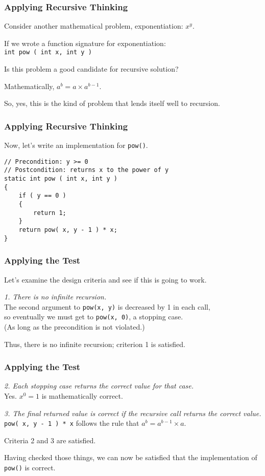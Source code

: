 \begin{frame}
\frametitle{Applying Recursive Thinking}
Consider another mathematical problem, exponentiation: $x^{y}$.

If we wrote a function signature for exponentiation:\\ \texttt{int pow ( int x, int y )}

Is this problem a good candidate for recursive solution?

Mathematically, $a^{b} = a \times a^{b-1}$.

So, yes, this is the kind of problem that lends itself well to recursion.


\end{frame}

\begin{frame}[fragile]
\frametitle{Applying Recursive Thinking}
Now, let's write an implementation for \texttt{pow()}.

\begin{verbatim}
// Precondition: y >= 0
// Postcondition: returns x to the power of y
static int pow ( int x, int y )
{
    if ( y == 0 )
    {
        return 1;
    }
    return pow( x, y - 1 ) * x;
}
\end{verbatim}

\end{frame}

\begin{frame}
\frametitle{Applying the Test}
Let's examine the design criteria and see if this is going to work.

\textit{1. There is no infinite recursion.}\\
\quad The second argument to \texttt{pow(x, y)} is decreased by 1 in each call,\\ \quad so eventually we must get to \texttt{pow(x, 0)}, a stopping case.\\
\quad \quad (As long as the precondition is not violated.)

Thus, there is no infinite recursion; criterion 1 is satisfied.

\end{frame}

\begin{frame}
\frametitle{Applying the Test}

\textit{2. Each stopping case returns the correct value for that case.}\\
\quad Yes. $x^{0} = 1$ is mathematically correct.

\textit{3. The final returned value is correct if the recursive call returns the correct value.}\\
\quad \texttt{pow( x, y - 1 ) * x} follows the rule that $a^{b} = a^{b-1} \times a$.

Criteria 2 and 3 are satisfied.

Having checked those things, we can now be satisfied that the implementation of \texttt{pow()} is correct. 

\end{frame}

